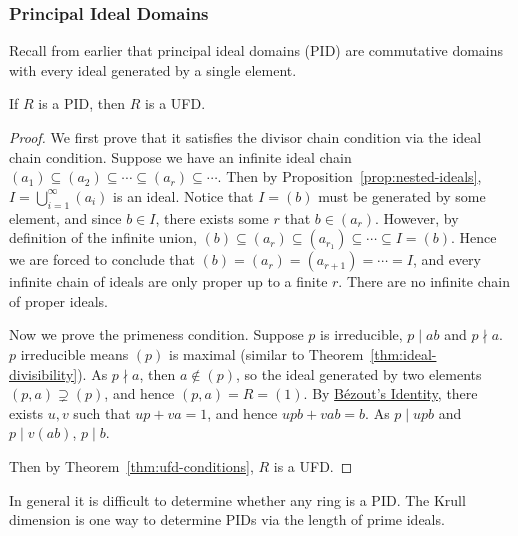 \subsubsection*{Principal Ideal Domains}

\begin{remark}
    Recall from earlier that principal ideal domains (PID)
    are commutative domains with every ideal generated by a single element.
\end{remark}
\begin{theorem}\label{thm:pid-ufd}
    If \(R\) is a PID, then \(R\) is a UFD.\@
\end{theorem}
\begin{proof}
    We first prove that it satisfies the divisor chain condition
    via the ideal chain condition.
    Suppose we have an infinite ideal chain
    \((a_1) \subseteq (a_2) \subseteq \cdots \subseteq (a_r) \subseteq \cdots\).
    Then by Proposition~\ref{prop:nested-ideals},
    \(I = \bigcup_{i=1}^\infty (a_i)\) is an ideal.
    Notice that \(I = (b)\) must be generated by some element,
    and since \(b \in I\), there exists some \(r\) that \(b \in (a_r)\).
    However, by definition of the infinite union,
    \((b) \subseteq (a_r) \subseteq (a_{r_1}) \subseteq \cdots \subseteq I = (b)\).
    Hence we are forced to conclude that \((b) = (a_r) = (a_{r+1}) = \cdots = I\),
    and every infinite chain of ideals are only proper up to a finite \(r\).
    There are no infinite chain of proper ideals.

    Now we prove the primeness condition.
    Suppose \(p\) is irreducible, \(p \mid ab\) and \(p \nmid a\).
    \(p\) irreducible means \((p)\) is maximal
    (similar to Theorem~\ref{thm:ideal-divisibility}).
    As \(p \nmid a\), then \(a \notin (p)\),
    so the ideal generated by two elements \((p,a) \supsetneq (p)\),
    and hence \((p,a) = R = (1)\).
    By \hyperref[thm:bezout]{B\'{e}zout's Identity},
    there exists \(u,v\) such that \(up + va = 1\),
    and hence \(upb + vab = b\).
    As \(p \mid upb\) and \(p \mid v(ab)\), \(p \mid b\).

    Then by Theorem~\ref{thm:ufd-conditions}, \(R\) is a UFD.\@
\end{proof}
\begin{remark}
    In general it is difficult to determine whether any ring is a PID.\@
    The Krull dimension is one way to determine PIDs
    via the length of prime ideals.
\end{remark}

